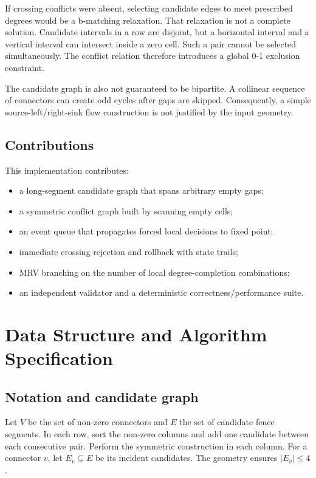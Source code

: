 \documentclass[11pt,a4paper,oneside]{article}
\begin{document}
If crossing conflicts were absent, selecting candidate edges to meet prescribed
degrees would be a b-matching relaxation. That relaxation is not a complete
solution. Candidate intervals in a row are disjoint, but a horizontal interval
and a vertical interval can intersect inside a zero cell. Such a pair cannot be
selected simultaneously. The conflict relation therefore introduces a global
0-1 exclusion constraint.

The candidate graph is also not guaranteed to be bipartite. A collinear sequence
of connectors can create odd cycles after gaps are skipped. Consequently, a
simple source-left/right-sink flow construction is not justified by the input
geometry.

\subsection{Contributions}

This implementation contributes:
\begin{itemize}
  \item a long-segment candidate graph that spans arbitrary empty gaps;
  \item a symmetric conflict graph built by scanning empty cells;
  \item an event queue that propagates forced local decisions to fixed point;
  \item immediate crossing rejection and rollback with state trails;
  \item MRV branching on the number of local degree-completion combinations;
  \item an independent validator and a deterministic correctness/performance suite.
\end{itemize}

\section{Data Structure and Algorithm Specification}

\subsection{Notation and candidate graph}

Let $V$ be the set of non-zero connectors and $E$ the set of candidate fence
segments. In each row, sort the non-zero columns and add one candidate between
each consecutive pair. Perform the symmetric construction in each column. For a
connector $v$, let $E_v\subseteq E$ be its incident candidates. The geometry
ensures $|E_v|\le4$.
\end{document}
